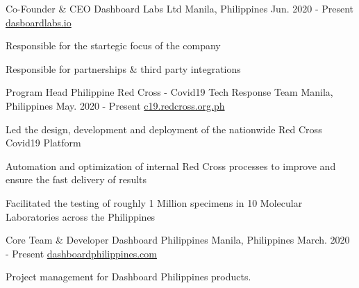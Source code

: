 
\begin{cventries}
  \cventry
    {Co-Founder \& CEO} %
    {Dashboard Labs Ltd} %
    {Manila, Philippines} %
    {Jun. 2020 - Present} %
    {\href{https://dashboardlabs.io}{dasboardlabs.io}} %
    {
      \begin{cvitems} %
      \item {Responsible for the startegic focus of the company}
      \item {Responsible for partnerships \& third party integrations}
      \end{cvitems}
    }
  \cventry
    {Program Head } %
    {Philippine Red Cross - Covid19 Tech Response Team} %
    {Manila, Philippines} %
    {May. 2020 - Present} %
    {\href{https://c19.redcross.org.ph}{c19.redcross.org.ph}} %
    {
      \begin{cvitems} %
      \item {Led the design, development and deployment of the nationwide Red Cross Covid19 Platform}
      \item {Automation and optimization of internal Red Cross processes to improve and ensure the fast delivery of results}
      \item {Facilitated the testing of roughly 1 Million specimens in 10 Molecular Laboratories across the Philippines}
      \end{cvitems}
    }
  \cventry
    {Core Team \& Developer} %
    {Dashboard Philippines} %
    {Manila, Philippines} %
    {March. 2020 - Present} %
    {\href{https://dashboardphilippines.com}{dashboardphilippines.com}} %
    {
      \begin{cvitems} %
      \item {Project management for Dashboard Philippines products.}

\end{cvitems}}
\end{cventries}
